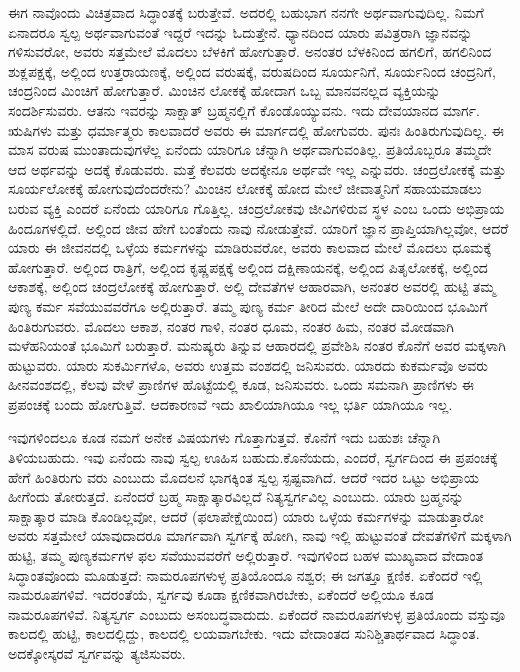 ಈಗ ನಾವೊಂದು ವಿಚಿತ್ರವಾದ ಸಿದ್ಧಾಂತಕ್ಕೆ ಬರುತ್ತೇವೆ. ಅದರಲ್ಲಿ ಬಹುಭಾಗ ನನಗೇ ಅರ್ಥವಾಗುವುದಿಲ್ಲ. ನಿಮಗೆ ಏನಾದರೂ ಸ್ವಲ್ಪ ಅರ್ಥವಾಗುವಂತೆ ಇದ್ದರೆ ಇದನ್ನು ಓದುತ್ತೇನೆ. ಧ್ಯಾನದಿಂದ ಯಾರು ಪವಿತ್ರರಾಗಿ ಜ್ಞಾನವನ್ನು ಗಳಿಸುವರೋ, ಅವರು ಸತ್ತಮೇಲೆ ಮೊದಲು ಬೆಳಕಿಗೆ ಹೋಗುತ್ತಾರೆ. ಅನಂತರ ಬೆಳಕಿನಿಂದ ಹಗಲಿಗೆ, ಹಗಲಿನಿಂದ ಶುಕ್ಲಪಕ್ಷಕ್ಕೆ, ಅಲ್ಲಿಂದ ಉತ್ತರಾಯಣಕ್ಕೆ, ಅಲ್ಲಿಂದ ವರುಷಕ್ಕೆ, ವರುಷದಿಂದ ಸೂರ್ಯನಿಗೆ, ಸೂರ್ಯನಿಂದ ಚಂದ್ರನಿಗೆ, ಚಂದ್ರನಿಂದ ಮಿಂಚಿಗೆ ಹೋಗುತ್ತಾರೆ. ಮಿಂಚಿನ ಲೋಕಕ್ಕೆ ಹೋದಾಗ ಒಬ್ಬ ಮಾನವನಲ್ಲದ ವ್ಯಕ್ತಿಯನ್ನು ಸಂದರ್ಶಿಸುವರು. ಆತನು ಇವರನ್ನು ಸಾಕ್ಷಾತ್​ ಬ್ರಹ್ಮನಲ್ಲಿಗೆ ಕೊಂಡೊಯ್ಯುವನು. ಇದು ದೇವಯಾನದ ಮಾರ್ಗ. ಋಷಿಗಳು ಮತ್ತು ಧರ್ಮಾತ್ಮರು ಕಾಲವಾದರೆ ಅವರು ಈ ಮಾರ್ಗದಲ್ಲಿ ಹೋಗುವರು. ಪುನಃ ಹಿಂತಿರುಗುವುದಿಲ್ಲ. ಈ ಮಾಸ ವರುಷ ಮುಂತಾದುವುಗಳೆಲ್ಲ ಏನೆಂದು ಯಾರಿಗೂ ಚೆನ್ನಾಗಿ ಅರ್ಥವಾಗುವಂತಿಲ್ಲ. ಪ್ರತಿಯೊಬ್ಬರೂ ತಮ್ಮದೇ ಆದ ಅರ್ಥವನ್ನು ಅದಕ್ಕೆ ಕೊಡುವರು. ಮತ್ತೆ ಕೆಲವರು ಅದಕ್ಕೇನೂ ಅರ್ಥವೇ ಇಲ್ಲ ಎನ್ನುವರು. ಚಂದ್ರಲೋಕಕ್ಕೆ ಮತ್ತು ಸೂರ್ಯಲೋಕಕ್ಕೆ ಹೋಗುವುದೆಂದರೇನು? ಮಿಂಚಿನ ಲೋಕಕ್ಕೆ ಹೋದ ಮೇಲೆ ಜೀವಾತ್ಮನಿಗೆ ಸಹಾಯಮಾಡಲು ಬರುವ ವ್ಯಕ್ತಿ ಎಂದರೆ ಏನೆಂದು ಯಾರಿಗೂ ಗೊತ್ತಿಲ್ಲ. ಚಂದ್ರಲೋಕವು ಜೀವಿಗಳಿರುವ ಸ್ಥಳ ಎಂಬ ಒಂದು ಅಭಿಪ್ರಾಯ ಹಿಂದೂಗಳಲ್ಲಿದೆ. ಅಲ್ಲಿಂದ ಜೀವ ಹೇಗೆ ಬಂತೆಂದು ನಾವು ನೋಡುತ್ತೇವೆ. ಯಾರಿಗೆ ಜ್ಞಾನ ಪ್ರಾಪ್ತಿಯಾಗಿಲ್ಲವೋ, ಆದರೆ ಯಾರು ಈ ಜೀವನದಲ್ಲಿ ಒಳ್ಳೆಯ ಕರ್ಮಗಳನ್ನು ಮಾಡಿರುವರೋ, ಅವರು ಕಾಲವಾದ ಮೇಲೆ ಮೊದಲು ಧೂಮಕ್ಕೆ ಹೋಗುತ್ತಾರೆ. ಅಲ್ಲಿಂದ ರಾತ್ರಿಗೆ, ಅಲ್ಲಿಂದ ಕೃಷ್ಣಪಕ್ಷಕ್ಕೆ ಅಲ್ಲಿಂದ ದಕ್ಷಿಣಾಯನಕ್ಕೆ, ಅಲ್ಲಿಂದ ಪಿತೃಲೋಕಕ್ಕೆ, ಅಲ್ಲಿಂದ ಆಕಾಶಕ್ಕೆ, ಅಲ್ಲಿಂದ ಚಂದ್ರಲೋಕಕ್ಕೆ ಹೋಗುತ್ತಾರೆ. ಅಲ್ಲಿ ದೇವತೆಗಳ ಆಹಾರವಾಗಿ, ಅನಂತರ ಅವರಲ್ಲಿ ಹುಟ್ಟಿ ತಮ್ಮ ಪುಣ್ಯ ಕರ್ಮ ಸವೆಯುವವರೆಗೂ ಅಲ್ಲಿರುತ್ತಾರೆ. ತಮ್ಮ ಪುಣ್ಯ ಕರ್ಮ ತೀರಿದ ಮೇಲೆ ಅದೇ ದಾರಿಯಿಂದ ಭೂಮಿಗೆ ಹಿಂತಿರುಗುವರು. ಮೊದಲು ಆಕಾಶ, ನಂತರ ಗಾಳಿ, ನಂತರ ಧೂಮ, ನಂತರ ಹಿಮ, ನಂತರ ಮೋಡವಾಗಿ ಮಳೆಹನಿಯಂತೆ ಭೂಮಿಗೆ ಬರುತ್ತಾರೆ. ಮನುಷ್ಯರು ತಿನ್ನುವ ಆಹಾರದಲ್ಲಿ ಪ್ರವೇಶಿಸಿ ನಂತರ ಕೊನೆಗೆ ಅವರ ಮಕ್ಕಳಾಗಿ ಹುಟ್ಟುವರು. ಯಾರು ಸುಕರ್ಮಿಗಳೊ, ಅವರು ಉತ್ತಮ ವಂಶದಲ್ಲಿ ಜನಿಸುವರು. ಯಾರದು ಕುಕರ್ಮವೊ ಅವರು ಹೀನವಂಶದಲ್ಲಿ, ಕೆಲವು ವೇಳೆ ಪ್ರಾಣಿಗಳ ಹೊಟ್ಟೆಯಲ್ಲಿ ಕೂಡ, ಜನಿಸುವರು. ಒಂದು ಸಮನಾಗಿ ಪ್ರಾಣಿಗಳು ಈ ಪ್ರಪಂಚಕ್ಕೆ ಬಂದು ಹೋಗುತ್ತಿವೆ. ಆದಕಾರಣವೆ ಇದು ಖಾಲಿಯಾಗಿಯೂ ಇಲ್ಲ ಭರ್ತಿ ಯಾಗಿಯೂ ಇಲ್ಲ.

ಇವುಗಳಿಂದಲೂ ಕೂಡ ನಮಗೆ ಅನೇಕ ವಿಷಯಗಳು ಗೊತ್ತಾಗುತ್ತವೆ. ಕೊನೆಗೆ ಇದು ಬಹುಶಃ ಚೆನ್ನಾಗಿ ತಿಳಿಯಬಹುದು. ಇವು ಏನೆಂದು ನಾವು ಸ್ವಲ್ಪ ಊಹಿಸ ಬಹುದು.ಕೊನೆಯದು, ಎಂದರೆ, ಸ್ವರ್ಗದಿಂದ ಈ ಪ್ರಪಂಚಕ್ಕೆ ಹೇಗೆ ಹಿಂತಿರುಗು ವರು ಎಂಬುದು ಮೊದಲನೆ ಭಾಗಕ್ಕಿಂತ ಸ್ವಲ್ಪ ಸ್ಪಷ್ಟವಾಗಿದೆ. ಆದರೆ ಇದರ ಒಟ್ಟು ಅಭಿಪ್ರಾಯ ಹೀಗೆಂದು ತೋರುತ್ತದೆ. ಏನೆಂದರೆ ಬ್ರಹ್ಮ ಸಾಕ್ಷಾತ್ಕಾರವಿಲ್ಲದೆ ನಿತ್ಯಸ್ವರ್ಗವಿಲ್ಲ ಎಂಬುದು. ಯಾರು ಬ್ರಹ್ಮನನ್ನು ಸಾಕ್ಷಾತ್ಕಾರ ಮಾಡಿ ಕೊಂಡಿಲ್ಲವೋ, ಆದರೆ (ಫಲಾಪೇಕ್ಷೆಯಿಂದ) ಯಾರು ಒಳ್ಳೆಯ ಕರ್ಮಗಳನ್ನು ಮಾಡುತ್ತಾರೋ ಅವರು ಸತ್ತಮೇಲೆ ಯಾವುದಾದರೂ ಮಾರ್ಗವಾಗಿ ಸ್ವರ್ಗಕ್ಕೆ ಹೋಗಿ, ನಾವು ಇಲ್ಲಿ ಹುಟ್ಟುವಂತೆ ದೇವತೆಗಳಿಗೆ ಮಕ್ಕಳಾಗಿ ಹುಟ್ಟಿ, ತಮ್ಮ ಪುಣ್ಯಕರ್ಮಗಳ ಫಲ ಸವೆಯುವವರೆಗೆ ಅಲ್ಲಿರುತ್ತಾರೆ. ಇವುಗಳಿಂದ ಬಹಳ ಮುಖ್ಯವಾದ ವೇದಾಂತ ಸಿದ್ಧಾಂತವೊಂದು ಮೂಡುತ್ತದೆ: ನಾಮರೂಪಗಳುಳ್ಳ ಪ್ರತಿಯೊಂದೂ ನಶ್ವರ; ಈ ಜಗತ್ತೂ ಕ್ಷಣಿಕ. ಏಕೆಂದರೆ ಇಲ್ಲಿ ನಾಮರೂಪಗಳಿವೆ. ಇದರಂತೆಯೆ, ಸ್ವರ್ಗವು ಕೂಡಾ ಕ್ಷಣಿಕವಾಗಿರಬೇಕು, ಏಕೆಂದರೆ ಅಲ್ಲಿಯೂ ಕೂಡ ನಾಮರೂಪಗಳಿವೆ. ನಿತ್ಯಸ್ವರ್ಗ ಎಂಬುದು ಅಸಂಬದ್ಧವಾದುದು. ಏಕೆಂದರೆ ನಾಮರೂಪಗಳುಳ್ಳ ಪ್ರತಿಯೊಂದು ವಸ್ತುವೂ ಕಾಲದಲ್ಲಿ ಹುಟ್ಟಿ, ಕಾಲದಲ್ಲಿದ್ದು, ಕಾಲದಲ್ಲಿ ಲಯವಾಗಬೇಕು. ಇದು ವೇದಾಂತದ ಸುನಿಶ್ಚಿತಾರ್ಥವಾದ ಸಿದ್ಧಾಂತ. ಅದಕ್ಕೋಸ್ಕರವೆ ಸ್ವರ್ಗವನ್ನು ತ್ಯಜಿಸುವರು.

